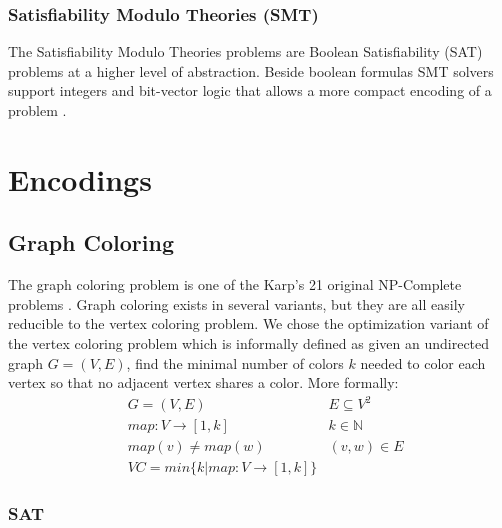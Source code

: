 \documentclass{sig-alternate}
\begin{document}
\subsubsection*{Satisfiability Modulo Theories (SMT)}
The Satisfiability Modulo Theories problems are Boolean Satisfiability (SAT) problems at a higher level of abstraction. Beside boolean formulas SMT solvers support integers and bit-vector logic that allows a more compact encoding of a problem \cite{wille2008using}.

\section{Encodings}

\subsection{Graph Coloring}

The graph coloring problem is one of the Karp's 21 original NP-Complete problems \cite{karp1972reducibility}.
Graph coloring exists in several variants, but they are all easily reducible to the vertex coloring problem. We chose the optimization variant of the vertex coloring problem which is informally defined as given an undirected graph $G = (V,E)$, find the minimal number of colors $k$ needed to color each vertex so that no adjacent vertex shares a color. More formally:
\begin{subequations}
\begin{align*}
        & G = (V,E) & E \subseteq V^2\\
        & map : V \rightarrow [1,k] & k \in \mathbb{N} \\
        & map(v) \neq map(w) & (v,w) \in E \\
        & VC = min\{k | map : V \rightarrow [1,k]\}
\end{align*}
\end{subequations}


\subsubsection{SAT}
\end{document}
